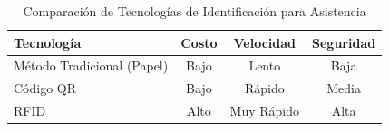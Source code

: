 \begin{table}[htbp]
\centering
\caption{Comparación de Tecnologías de Identificación para Asistencia}
\label{tab:frameworks}
\small
\renewcommand{\arraystretch}{0.8}
\begin{tabular}{lccc}
\toprule
\textbf{Tecnología} & \textbf{Costo} & \textbf{Velocidad} & \textbf{Seguridad} \\
\midrule
Método Tradicional (Papel) & Bajo & Lento & Baja \\
Código QR & Bajo & Rápido & Media \\
RFID & Alto & Muy Rápido & Alta \\
\bottomrule
\end{tabular}
\end{table}